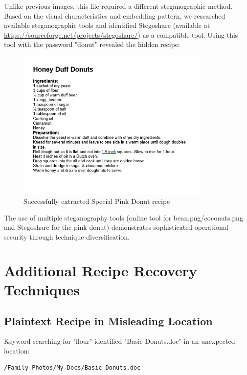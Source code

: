 Unlike previous images, this file required a different steganographic method. Based on the visual characteristics and embedding pattern, we researched available steganographic tools and identified Stegoshare (available at \url{https://sourceforge.net/projects/stegoshare/}) as a compatible tool. Using this tool with the password "donut" revealed the hidden recipe:

\begin{figure}[htbp]
    \centering
    \includegraphics[width=0.85\textwidth]{images/Artifact and Evidence Recovery/SpecialPinkDonut_extract.png}
    \caption{Successfully extracted Special Pink Donut recipe}
    \label{fig:pink_donut_extract}
\end{figure}

The use of multiple steganography tools (online tool for bean.png/coconuts.png and Stegoshare for the pink donut) demonstrates sophisticated operational security through technique diversification.

\section{Additional Recipe Recovery Techniques}

\subsection{Plaintext Recipe in Misleading Location}
Keyword searching for "flour" identified "Basic Donuts.doc" in an unexpected location:
\begin{verbatim}
/Family Photos/My Docs/Basic Donuts.doc
\end{verbatim}

